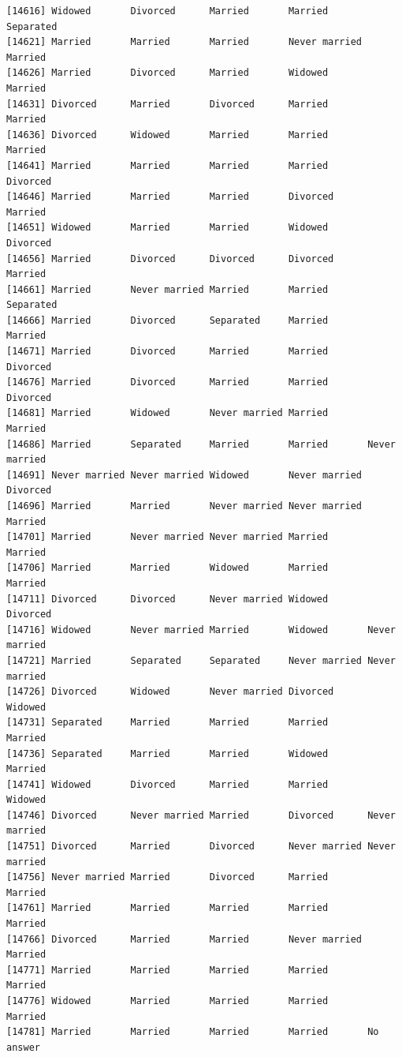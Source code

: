 \documentclass[
  letterpaper,
  DIV=11,
  numbers=noendperiod,
  oneside]{scrartcl}
\begin{document}
\begin{verbatim}
[14616] Widowed       Divorced      Married       Married       Separated    
[14621] Married       Married       Married       Never married Married      
[14626] Married       Divorced      Married       Widowed       Married      
[14631] Divorced      Married       Divorced      Married       Married      
[14636] Divorced      Widowed       Married       Married       Married      
[14641] Married       Married       Married       Married       Divorced     
[14646] Married       Married       Married       Divorced      Married      
[14651] Widowed       Married       Married       Widowed       Divorced     
[14656] Married       Divorced      Divorced      Divorced      Married      
[14661] Married       Never married Married       Married       Separated    
[14666] Married       Divorced      Separated     Married       Married      
[14671] Married       Divorced      Married       Married       Divorced     
[14676] Married       Divorced      Married       Married       Divorced     
[14681] Married       Widowed       Never married Married       Married      
[14686] Married       Separated     Married       Married       Never married
[14691] Never married Never married Widowed       Never married Divorced     
[14696] Married       Married       Never married Never married Married      
[14701] Married       Never married Never married Married       Married      
[14706] Married       Married       Widowed       Married       Married      
[14711] Divorced      Divorced      Never married Widowed       Divorced     
[14716] Widowed       Never married Married       Widowed       Never married
[14721] Married       Separated     Separated     Never married Never married
[14726] Divorced      Widowed       Never married Divorced      Widowed      
[14731] Separated     Married       Married       Married       Married      
[14736] Separated     Married       Married       Widowed       Married      
[14741] Widowed       Divorced      Married       Married       Widowed      
[14746] Divorced      Never married Married       Divorced      Never married
[14751] Divorced      Married       Divorced      Never married Never married
[14756] Never married Married       Divorced      Married       Married      
[14761] Married       Married       Married       Married       Married      
[14766] Divorced      Married       Married       Never married Married      
[14771] Married       Married       Married       Married       Married      
[14776] Widowed       Married       Married       Married       Married      
[14781] Married       Married       Married       Married       No answer    

\end{verbatim}
\end{document}
